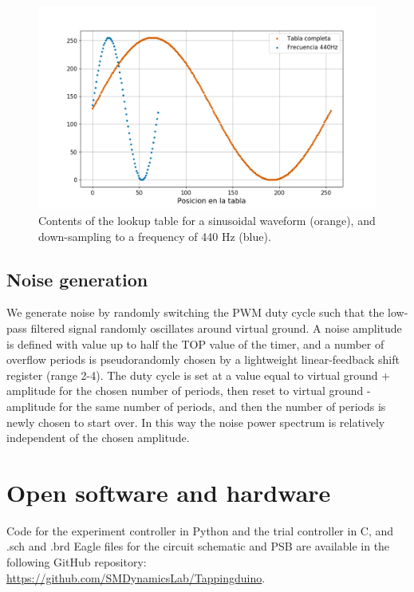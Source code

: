 \documentclass[twocolumn]{article}
\begin{document}
\begin{figure}[ht]
    \centering
        \includegraphics[width=\linewidth]{figures/Esquema_LUT_Sin.png}
        \caption{Contents of the lookup table for a sinusoidal waveform (orange), and down-sampling to a frequency of 440 Hz (blue).}
        \label{fig.TablaSenoCompletay440}
\end{figure}



\subsection{Noise generation}
\label{sec.noise}

We generate noise by randomly switching the PWM duty cycle such that the low-pass filtered signal randomly oscillates around virtual ground. A noise amplitude is defined with value up to half the TOP value of the timer, and a number of overflow periods is pseudorandomly chosen by a lightweight linear-feedback shift register \cite{galoisLFSR} (range 2-4). The duty cycle is set at a value equal to virtual ground + amplitude for the chosen number of periods, then reset to virtual ground - amplitude for the same number of periods, and then the number of periods is newly chosen to start over. In this way the noise power spectrum is relatively independent of the chosen amplitude.


\section{Open software and hardware}

Code for the experiment controller in Python and the trial controller in C, and .sch and .brd Eagle files for the circuit schematic and PSB are available in the following GitHub repository: \url{https://github.com/SMDynamicsLab/Tappingduino}.


\printbibliography
\end{document}
